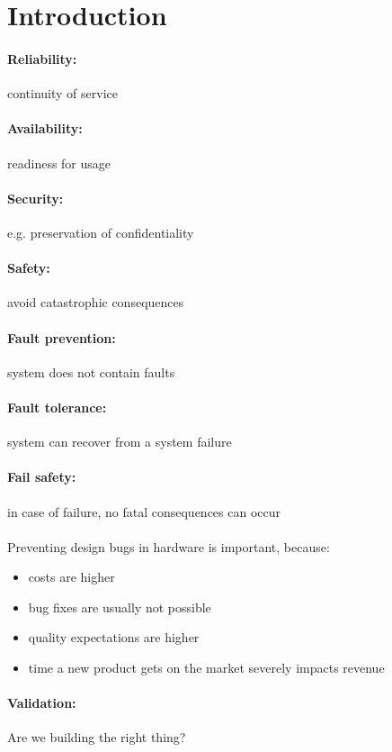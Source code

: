 \documentclass{article}
\begin{document}
\section{Introduction}
\paragraph{Reliability:} continuity of service
\paragraph{Availability:} readiness for usage
\paragraph{Security:} e.g. preservation of confidentiality
\paragraph{Safety:} avoid catastrophic consequences

\paragraph{Fault prevention:} system does not contain faults
\paragraph{Fault tolerance:} system can recover from a system failure
\paragraph{Fail safety:} in case of failure, no fatal consequences can occur 

\paragraph{}
Preventing design bugs in hardware is important, because:
\begin{itemize}
\item costs are higher
\item bug fixes are usually not possible
\item quality expectations are higher
\item time a new product gets on the market severely impacts revenue
\end{itemize}

\paragraph{Validation:} Are we building the right thing?
\end{document}
